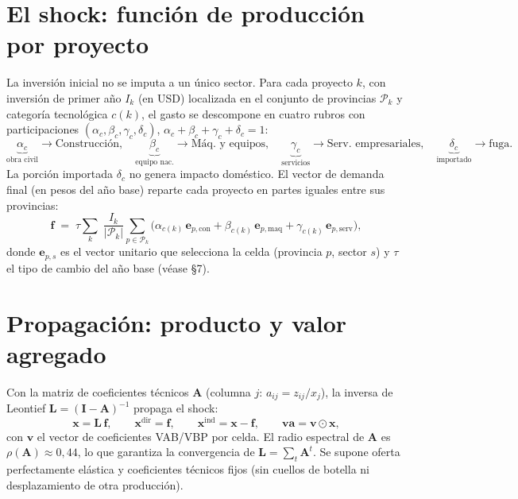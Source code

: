 \documentclass[11pt]{article}
\begin{document}
\section{El shock: función de producción por proyecto}
La inversión inicial no se imputa a un único sector. Para cada proyecto $k$, con inversión de primer año $I_k$ (en USD) localizada en el conjunto de provincias $\mathcal{P}_k$ y categoría tecnológica $c(k)$, el gasto se descompone en cuatro rubros con participaciones $(\alpha_c,\beta_c,\gamma_c,\delta_c)$, $\alpha_c+\beta_c+\gamma_c+\delta_c=1$:
\[
\underbrace{\alpha_c}_{\text{obra civil}}\!\to\text{Construcción},\quad
\underbrace{\beta_c}_{\text{equipo nac.}}\!\to\text{Máq. y equipos},\quad
\underbrace{\gamma_c}_{\text{servicios}}\!\to\text{Serv. empresariales},\quad
\underbrace{\delta_c}_{\text{importado}}\!\to\text{fuga}.
\]
La porción importada $\delta_c$ no genera impacto doméstico. El vector de demanda final (en pesos del año base) reparte cada proyecto en partes iguales entre sus provincias:
\begin{equation}
\mathbf{f} \;=\; \tau \sum_{k}\; \frac{I_k}{|\mathcal{P}_k|}\sum_{p\in\mathcal{P}_k}\Big(\alpha_{c(k)}\,\mathbf{e}_{p,\text{con}}+\beta_{c(k)}\,\mathbf{e}_{p,\text{maq}}+\gamma_{c(k)}\,\mathbf{e}_{p,\text{serv}}\Big),
\end{equation}
donde $\mathbf{e}_{p,s}$ es el vector unitario que selecciona la celda (provincia $p$, sector $s$) y $\tau$ el tipo de cambio del año base (véase §7).

\section{Propagación: producto y valor agregado}
Con la matriz de coeficientes técnicos $\mathbf{A}$ (columna $j$: $a_{ij}=z_{ij}/x_j$), la inversa de Leontief $\mathbf{L}=(\mathbf{I}-\mathbf{A})^{-1}$ propaga el shock:
\begin{equation}
\mathbf{x}=\mathbf{L}\,\mathbf{f},\qquad
\mathbf{x}^{\text{dir}}=\mathbf{f},\qquad
\mathbf{x}^{\text{ind}}=\mathbf{x}-\mathbf{f},\qquad
\mathbf{va}=\mathbf{v}\odot\mathbf{x},
\end{equation}
con $\mathbf{v}$ el vector de coeficientes VAB/VBP por celda. El radio espectral de $\mathbf{A}$ es $\rho(\mathbf{A})\approx0{,}44$, lo que garantiza la convergencia de $\mathbf{L}=\sum_t \mathbf{A}^t$. Se supone oferta perfectamente elástica y coeficientes técnicos fijos (sin cuellos de botella ni desplazamiento de otra producción).
\end{document}
